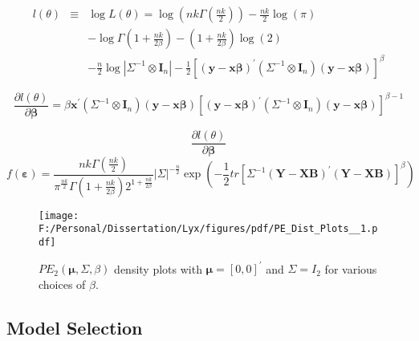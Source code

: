 \begin{eqnarray*}
l\left(\theta\right) & \equiv & \log L\left(\theta\right)=\log\left(nk\Gamma\left(\frac{nk}{2}\right)\right)-\frac{nk}{2}\log\left(\pi\right)\\
 &  & -\log\Gamma\left(1+\frac{nk}{2\beta}\right)-\left(1+\frac{nk}{2\beta}\right)\log\left(2\right)\\
 &  & -\frac{n}{2}\log\left\vert \Sigma^{-1}\otimes\mathbf{I}_{n}\right\vert -\frac{1}{2}\left[\left(\mathbf{y}-\mathbf{x\beta}\right)^{\prime}\left(\Sigma^{-1}\otimes\mathbf{I}_{n}\right)\left(\mathbf{y}-\mathbf{x\beta}\right)\right]^{\beta}
\end{eqnarray*}


\[
\frac{\partial l\left(\theta\right)}{\partial\mathbf{\beta}}=\beta\mathbf{x}^{\prime}\left(\Sigma^{-1}\otimes\mathbf{I}_{n}\right)\left(\mathbf{y}-\mathbf{x\beta}\right)\left[\left(\mathbf{y}-\mathbf{x\beta}\right)^{\prime}\left(\Sigma^{-1}\otimes\mathbf{I}_{n}\right)\left(\mathbf{y}-\mathbf{x\beta}\right)\right]^{\beta-1}
\]


\[
\frac{\partial l\left(\theta\right)}{\partial\mathbf{\beta}}
\]
\[
f\left(\mathbf{\varepsilon}\right)=\frac{nk\Gamma\left(\frac{nk}{2}\right)}{\pi^{\frac{nk}{2}}\Gamma\left(1+\frac{nk}{2\beta}\right)2^{1+\frac{nk}{2\beta}}}\left\vert \Sigma\right\vert ^{-\frac{n}{2}}\exp\left(-\frac{1}{2}tr\left[\Sigma^{-1}\left(\mathbf{Y}-\mathbf{XB}\right)^{\prime}\left(\mathbf{Y}-\mathbf{XB}\right)\right]^{\beta}\right)
\]


\begin{figure}[ptb]
\begin{centering}
\texttt{[image: F:/Personal/Dissertation/Lyx/figures/pdf/PE\_Dist\_Plots\_\_1.pdf]}\caption{$PE_{2}\left(\mathbf{\mu},\Sigma,\beta\right)$ density plots with
$\mathbf{\mu}=\left[0,0\right]^{\prime}$ and $\Sigma=I_{2}$ for
various choices of $\beta$.}

\par\end{centering}

\centering{}\label{PE Distribution Plots}
\end{figure}



\subsection{Model Selection}

